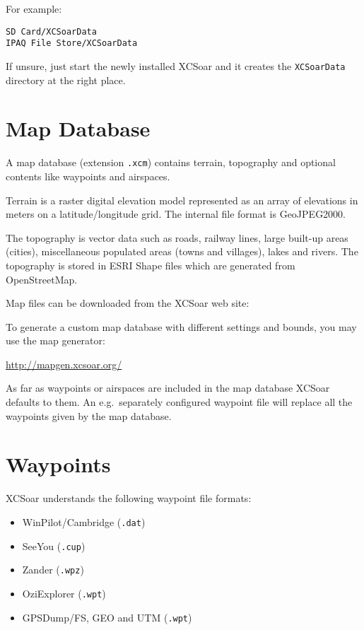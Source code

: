 For example:
\begin{verbatim}
SD Card/XCSoarData
IPAQ File Store/XCSoarData
\end{verbatim}

If unsure, just start the newly installed XCSoar and it creates the \verb|XCSoarData|
directory at the right place.

\section{Map Database}\label{sec:map}

A map database (extension \verb|.xcm|) contains terrain,
topography and optional contents like waypoints and airspaces.

Terrain is a raster digital elevation model represented as an array of
elevations in meters on a latitude/longitude grid.  The internal file
format is GeoJPEG2000.

The topography is vector data such as roads, railway lines, large
built-up areas (cities), miscellaneous populated areas (towns and
villages), lakes and rivers.  The topography is stored in ESRI Shape
files which are generated from OpenStreetMap.

Map files can be downloaded from the XCSoar web site:


To generate a custom map database with different settings and bounds, you
may use the map generator:

\url{http://mapgen.xcsoar.org/}

As far as waypoints or airspaces are included in the map database XCSoar
defaults to them. An e.g.\ separately configured waypoint file will replace all the
waypoints given by the map database.

\section{Waypoints}

XCSoar understands the following waypoint file formats:

\begin{itemize}
\item WinPilot/Cambridge (\verb|.dat|)
\item SeeYou (\verb|.cup|)
\item Zander (\verb|.wpz|)
\item OziExplorer (\verb|.wpt|)
\item GPSDump/FS, GEO and UTM (\verb|.wpt|)
\end{itemize}

